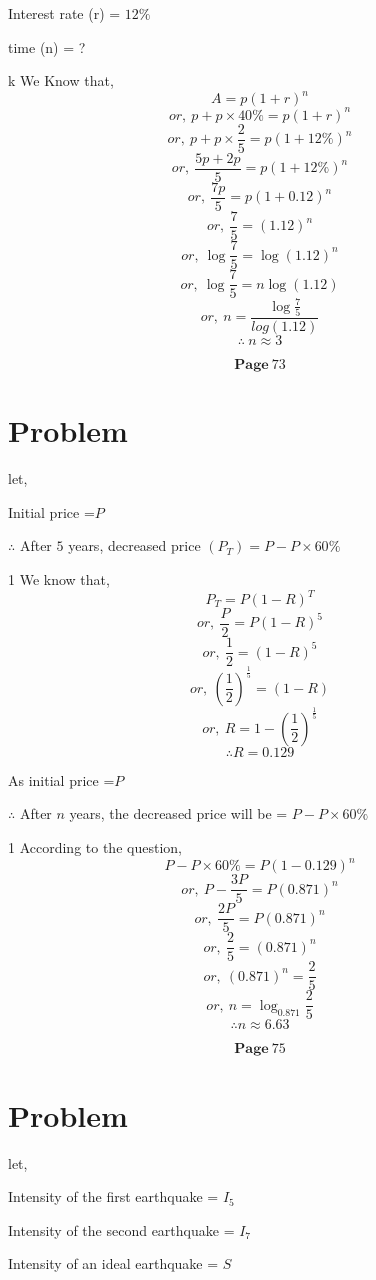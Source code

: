 \documentclass{report}
\begin{document}
Interest rate (r) = $12\%$

time (n) = ?

\hspace{30cm}
k We Know that,
$$A = p\left(1+r\right)^{n}$$
$$ or,\: p+ p\times 40 \%  = p\left(1+r\right)^{n}$$
$$ or,\: p+ p\times \frac{2}{5}  = p\left(1+12\% \right)^{n}$$
$$ or,\: \frac{5p+2p}{5}  = p\left(1+12\% \right)^{n}$$
$$ or,\: \frac{7p}{5}  = p\left(1+0.12 \right)^{n}$$
$$ or,\: \frac{7}{5}  = \left(1.12 \right)^{n}$$
$$ or,\: \log{\frac{7}{5}}  = \log{\left(1.12 \right)}^{n}$$
$$ or,\: \log{\frac{7}{5}}  = n\log{\left(1.12 \right)}$$
$$ or,\: n  = \frac{\log{\frac{7}{5}}}{log{\left(1.12 \right)}}$$
$$\therefore \: n \approx 3$$

\hspace{30cm}
$$\textbf{Page} \: 73$$
\section{Problem}
let,

Initial price =$P$

$\therefore$ After $5$ years, decreased price $(P_T) = P-P\times60\%$

\hspace{30cm}
1 We know that,
$$P_T = P\left(1-R\right)^T$$
$$ or,\:\frac{P}{2} = P(1-R)^{5}$$
$$ or,\:\frac{1}{2} = (1-R)^{5}$$
$$ or,\:\left(\frac{1}{2}\right)^\frac{1}{5} = (1-R)$$
$$ or,\:R = 1-\left(\frac{1}{2}\right)^{\frac{1}{5}}$$
$$\therefore R = 0.129$$

As initial price =$P$

$\therefore$ After $n$ years, the decreased price will be = $P-P\times60\%$

\hspace{30cm}
1 According to the question,
$$P-P\times60\% = P(1-0.129)^{n}$$
$$or,\:P-\frac{3P}{5} = P(0.871)^{n}$$
$$or,\:\frac{2P}{5} = P(0.871)^{n}$$
$$or,\:\frac{2}{5} = (0.871)^{n}$$
$$or,\:(0.871)^{n} = \frac{2}{5}$$
$$or,\:n = \log_{0.871}\frac{2}{5}$$
$$\therefore n \approx 6.63 $$

\hspace{30cm}
$$\textbf{Page} \: 75$$
\section{Problem}
let,

Intensity of the first earthquake  = $I_5$

Intensity of the second earthquake = $I_7$ 

Intensity of an ideal earthquake = $S$
\end{document}
